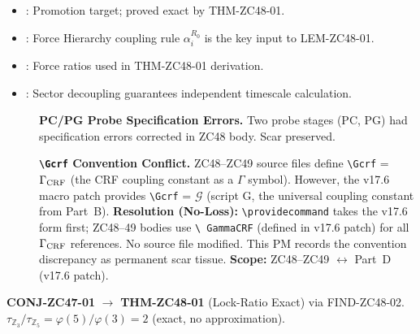 \documentclass[12pt, a4paper]{article}
\begin{document}
\begin{inheritbox}[title={ZC48 Backward Inheritance}]
\begin{itemize}[leftmargin=1.5em]
\item {}: Promotion target;
  proved exact by THM-ZC48-01.
\item {}: Force Hierarchy coupling rule
  $\alpha_i^{R_0}$ is the key input to LEM-ZC48-01.
\item {}: Force ratios used in
  THM-ZC48-01 derivation.
\item {}: Sector decoupling guarantees
  independent timescale calculation.
\end{itemize}
\end{inheritbox}

\begin{correctionbox}[title={ZC48 Forward Corrections / Phase Misalignments}]
\begin{description}
\item[] \textbf{PC/PG Probe Specification Errors.}
  Two probe stages (PC, PG) had specification errors corrected in ZC48
  body. Scar preserved.
\item[] \textbf{\texttt{\textbackslash Gcrf}
  Convention Conflict.}
  ZC48--ZC49 source files define
  \texttt{\textbackslash Gcrf} = $\Gamma_{\rm CRF}$ (the CRF coupling
  constant as a $\Gamma$ symbol). However, the v17.6 macro patch
  provides \texttt{\textbackslash Gcrf} = $\mathcal{G}$ (script G,
  the universal coupling constant from Part~B).
  \textbf{Resolution (No-Loss):} \texttt{\textbackslash providecommand}
  takes the v17.6 form first; ZC48--49 bodies use \texttt{\textbackslash
  GammaCRF} (defined in v17.6 patch) for all $\Gamma_{\rm CRF}$
  references. No source file modified. This PM records the convention
  discrepancy as permanent scar tissue.
  \textbf{Scope:} ZC48--ZC49 $\leftrightarrow$ Part~D (v17.6 patch).
\end{description}
\end{correctionbox}

\begin{conmapbox}[title={ZC48 Promotion Record}]
\textbf{CONJ-ZC47-01} $\to$ \textbf{THM-ZC48-01} (Lock-Ratio Exact)
via FIND-ZC48-02.\\
$\tau_{\mathbb{Z}_3}/\tau_{\mathbb{Z}_5} = \varphi(5)/\varphi(3) = 2$
(exact, no approximation).
\end{conmapbox}
\end{document}
